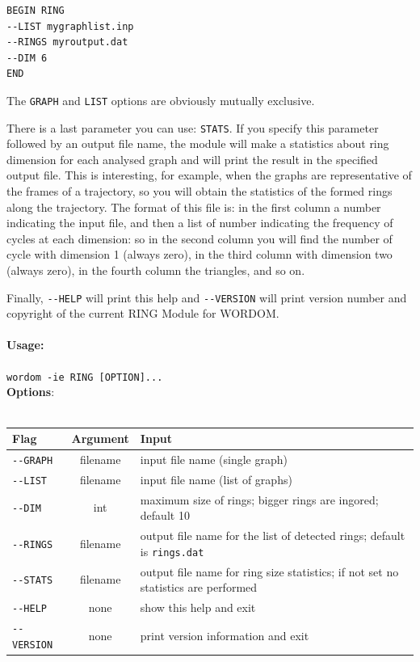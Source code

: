 \documentclass[11pt,twoside,onecolumn,a4paper,openright,notitlepage]{book}[2001/04/21]
\begin{document}
\begin{verbatim}
BEGIN RING
--LIST mygraphlist.inp
--RINGS myroutput.dat
--DIM 6
END
\end{verbatim}
%
The \verb=GRAPH= and \verb=LIST= options are obviously mutually exclusive.

There is a last parameter you can use: \verb=STATS=. If you specify this parameter followed by an output file name, the module will make a statistics about ring dimension for each analysed graph and will print the result in the specified output file. This is interesting, for example, when the graphs are representative of the frames of a trajectory, so you will obtain the statistics of the formed rings along the trajectory. The format of this file is: in the first column a number indicating the input file, and then a list of number indicating the frequency of cycles at each dimension: so in the second column you will find the number of cycle with dimension 1 (always zero), in the third column with dimension two (always zero), in the fourth column the triangles, and so on.

Finally, \verb=--HELP= will print this help and \verb=--VERSION= will print version number and copyright of the current RING Module for WORDOM.

\paragraph*{Usage:}
\verb=wordom -ie RING [OPTION]...=\\


\textbf{\large Options}:\\\\
\begin{tabular}{l|c|p{7.0cm}}
Flag & Argument & Input \\
\hline
\verb=--GRAPH=    & filename      & input file name (single graph)\\
\verb=--LIST=     & filename      & input file name (list of graphs)\\
\verb=--DIM=      & int           & maximum size of rings; bigger rings are ingored; default 10\\
\verb=--RINGS=    & filename      & output file name for the list of detected rings; default is \verb=rings.dat=\\
\verb=--STATS=    & filename      & output file name for ring size statistics; if not set no statistics are performed\\
\verb=--HELP=     & none          & show this help and exit\\
\verb=--VERSION=  & none          & print version information and exit\\
\end{tabular}\\\\
\end{document}
